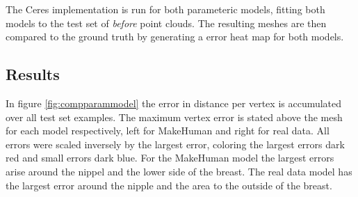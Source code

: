 The Ceres implementation is run for both parameteric models, fitting both models to the test set of \textit{before} point clouds. The resulting meshes are then compared to the ground truth by generating a error heat map for both models.

\subsection{Results}
In figure \ref{fig:compparammodel} the error in distance per vertex is accumulated over all test set examples. The maximum vertex error is stated above the mesh for each model respectively, left for MakeHuman and right for real data. All errors were scaled inversely by the largest error, coloring the largest errors dark red and small errors dark blue. For the MakeHuman model the largest errors arise around the nippel and the lower side of the breast. The real data model has the largest error around the nipple and the area to the outside of the breast.

